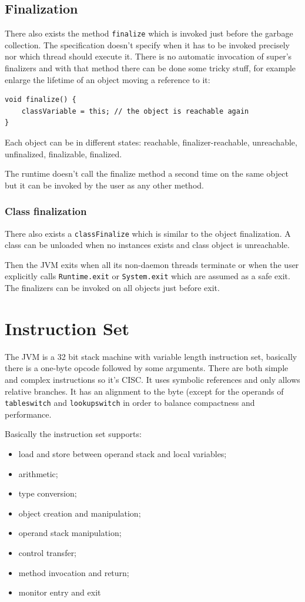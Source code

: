 \subsection{Finalization}
There also exists the method \verb|finalize| which is invoked just before the garbage collection.
The specification doesn't specify when it has to be invoked precisely nor which thread should execute it.
There is no automatic invocation of super's finalizers and with that method there can be done some tricky stuff, for example enlarge the lifetime of an object moving a reference to it:
\begin{verbatim}
void finalize() {
    classVariable = this; // the object is reachable again
}
\end{verbatim}

Each object can be in different states: reachable, finalizer-reachable, unreachable, unfinalized, finalizable, finalized.

The runtime doesn't call the finalize method a second time on the same object but it can be invoked by the user as any other method.

\subsubsection{Class finalization}
There also exists a \verb|classFinalize| which is similar to the object finalization.
A class can be unloaded when no instances exists and class object is unreachable.

Then the JVM exits when all its non-daemon threads terminate or when the user explicitly calls \verb|Runtime.exit| or \verb|System.exit| which are assumed as a safe exit.
The finalizers can be invoked on all objects just before exit.

\section{Instruction Set}
The JVM is a 32 bit stack machine with variable length instruction set, basically there is a one-byte opcode followed by some arguments.
There are both simple and complex instructions so it's CISC.
It uses symbolic references and only allows relative branches.
It has an alignment to the byte (except for the operands of \verb|tableswitch| and \verb|lookupswitch| in order to balance compactness and performance.

Basically the instruction set supports:
\begin{itemize}
    \item load and store between operand stack and local variables;
    \item arithmetic;
    \item type conversion;
    \item object creation and manipulation;
    \item operand stack manipulation;
    \item control transfer;
    \item method invocation and return;
    \item monitor entry and exit
\end{itemize}

